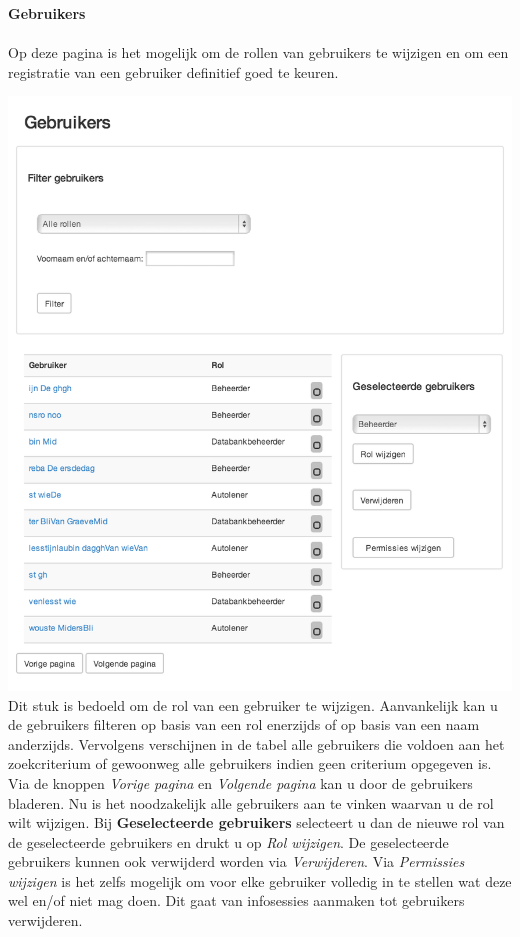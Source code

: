 \documentclass[11pt,a4paper,oneside]{article}
\begin{document}
{\large{\textbf{Gebruikers}}} \\\\
Op deze pagina is het mogelijk om de rollen van gebruikers te wijzigen en om een registratie van een gebruiker definitief goed te keuren.

\includegraphics[scale=0.6]{rolgebruikerwijzigen} \\
Dit stuk is bedoeld om de rol van een gebruiker te wijzigen. Aanvankelijk kan u de gebruikers filteren op basis van een rol enerzijds of op basis van een naam anderzijds. Vervolgens verschijnen in de tabel alle gebruikers die voldoen aan het zoekcriterium of gewoonweg alle gebruikers indien geen criterium opgegeven is. Via de knoppen \textit{Vorige pagina} en \textit{Volgende pagina} kan u door de gebruikers bladeren. Nu is het noodzakelijk alle gebruikers aan te vinken waarvan u de rol wilt wijzigen. Bij \textbf{Geselecteerde gebruikers} selecteert u dan de nieuwe rol van de geselecteerde gebruikers en drukt u op \textit{Rol wijzigen}. De geselecteerde gebruikers kunnen ook verwijderd worden via \textit{Verwijderen}. Via \textit{Permissies wijzigen} is het zelfs mogelijk om voor elke gebruiker volledig in te stellen wat deze wel en/of niet mag doen. Dit gaat van infosessies aanmaken tot gebruikers verwijderen. \\
\end{document}
